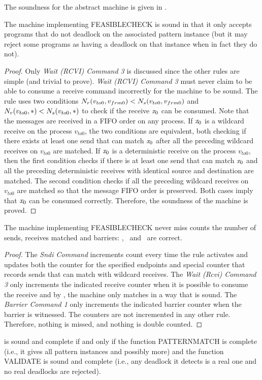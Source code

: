 The soundness for the abstract machine is given in .

\begin{lemma}
  The machine implementing \textrm{FEASIBLECHECK} is sound in that it
  only accepts programs that do not deadlock on the associated pattern
  instance (but it may reject some programs as having a deadlock on
  that instance when in fact they do not).
\label{lemma:sound}
\end{lemma}
\begin{proof}
  Only \emph{Wait (RCVI) Command 3} is discussed since the
  other rules are simple (and trivial to prove). \emph{Wait (RCVI) Command 3} must never
  claim to be able to consume a receive command incorrectly for
  the machine to be sound. The rule uses two conditions 
  $\textit{$N_r$}(v_{to0},v_{frm0}) < \textit{$N_s$}(v_{to0},v_{frm0})$
and 
$\textit{$N_r$}(v_{to0},\ast) < \textit{$N_s$}(v_{to0},\ast)$
to check if the receive $\mathit{x}_0$ can be consumed. Note that the messages are received in a FIFO order on any process. If $\mathit{x}_0$ is a wildcard receive on the process $v_{to0}$, the two conditions are equivalent, both checking if there exists at least one send that can match $\mathit{x}_0$ after all the preceding wildcard receives on $v_{to0}$ are matched. 
If $\mathit{x}_0$ is a deterministic receive on the process $v_{to0}$, then the first condition checks if there is at least one send that can match $\mathit{x}_0$ and all the preceding deterministic receives with identical source and destination are matched. The second condition checks if all the preceding wildcard receives on $v_{to0}$ are matched so that the message FIFO order is preserved. Both cases imply that $\mathit{x}_0$ can be consumed correctly. Therefore, the soundness of the machine is proved.  
\end{proof}

\begin{cor}
  The machine implementing \textrm{FEASIBLECHECK} never miss counts the number of sends, receives matched and barriers: \eprcv, \epsnd\ and \epbarrier\ are correct.
\end{cor}
\label{cor:count}
\begin{proof}
  The \emph{Sndi Command} increments count every time the rule activates and updates both the counter for the specified endpoints and special counter that records sends that can match with wildcard receives. The \emph{Wait (Rcvi) Command 3} only increments the indicated receive counter when it is possible to consume the receive and by , the machine only matches in a way that is sound. The \emph{Barrier Command 1} only increments the indicated barrier counter when the barrier is witnessed. The counters are not incremented in any other rule. Therefore, nothing is missed, and nothing is double counted.
\end{proof}
\begin{cor}
   is sound and complete if and only if the function \textrm{PATTERNMATCH} is complete (i.e., it gives all pattern instances and possibly more) and the function \textrm{VALIDATE} is sound and complete (i.e., any deadlock it detects is a real one and no real deadlocks are rejected).
\end{cor}
  

